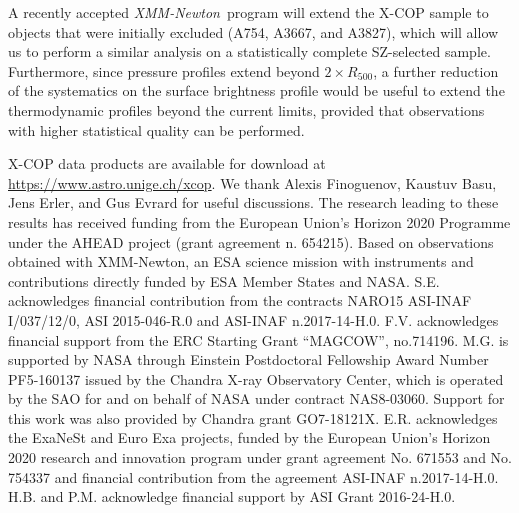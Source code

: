 \documentclass[traditabstract   ]{aa} %
\newcommand{\xmm}{{\it XMM-Newton}}
\begin{document}
A recently accepted \xmm\ program will extend the X-COP sample to objects that were initially excluded (A754, A3667, and A3827), which will allow us to perform a similar analysis on a statistically complete SZ-selected sample. Furthermore, since pressure profiles extend beyond $2 \times R_{500}$, a further reduction of the systematics on the surface brightness profile would be useful to extend the thermodynamic profiles beyond the current limits, provided that observations with higher statistical quality can be performed. 

\begin{acknowledgements} 
X-COP data products are available for download at \href{https://www.astro.unige.ch/xcop}{https://www.astro.unige.ch/xcop}. We thank Alexis Finoguenov, Kaustuv Basu, Jens Erler, and Gus Evrard for useful discussions. The research leading to these results has received funding from the European Union’s Horizon 2020 Programme under the AHEAD project (grant agreement n. 654215). Based on observations obtained with XMM-Newton, an ESA science mission with instruments and contributions directly funded by ESA Member States and NASA. S.E. acknowledges financial contribution from the contracts NARO15 ASI-INAF I/037/12/0, ASI 2015-046-R.0 and ASI-INAF n.2017-14-H.0. F.V. acknowledges financial support from the ERC Starting Grant ``MAGCOW'', no.714196. M.G. is supported by NASA through Einstein Postdoctoral Fellowship Award Number PF5-160137 issued by the Chandra X-ray Observatory Center, which is operated by the SAO for and on behalf of NASA under contract NAS8-03060. Support for this work was also provided by Chandra grant GO7-18121X. E.R. acknowledges the ExaNeSt and Euro Exa projects, funded by the European Union’s Horizon 2020 research and innovation program under grant agreement No. 671553 and No. 754337 and financial contribution from the agreement ASI-INAF n.2017-14-H.0. H.B. and P.M. acknowledge financial support by ASI Grant 2016-24-H.0.
\end{acknowledgements}


 
 
\end{document}
